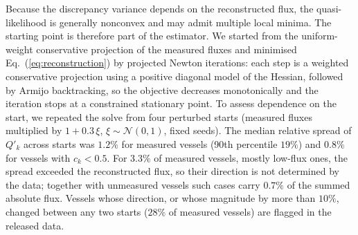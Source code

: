 Because the discrepancy variance depends on the reconstructed flux, the quasi-likelihood is generally nonconvex and may
admit multiple local minima. The starting point is therefore part of the estimator. We started from the uniform-weight conservative projection of the
measured fluxes and minimised Eq.~(\ref{eq:reconstruction}) by projected Newton iterations: each step is a weighted
conservative projection using a positive diagonal model of the Hessian, followed by Armijo backtracking, so the
objective decreases monotonically and the iteration stops at a constrained stationary point. To assess dependence on
the start, we repeated the solve from four perturbed starts (measured fluxes multiplied by $1+0.3\,\xi$,
$\xi\sim\mathcal N(0,1)$, fixed seeds). The median relative spread of $Q'_k$ across starts was $1.2\%$ for measured vessels (90th
percentile $19\%$) and $0.8\%$ for vessels with $c_k<0.5$. For $3.3\%$ of measured vessels, mostly low-flux ones, the
spread exceeded the reconstructed flux, so their direction is not determined by the data; together with unmeasured
vessels such cases carry $0.7\%$ of the summed absolute flux. Vessels whose direction, or whose magnitude by more than
$10\%$, changed between any two starts ($28\%$ of measured vessels) are flagged in the released data.
